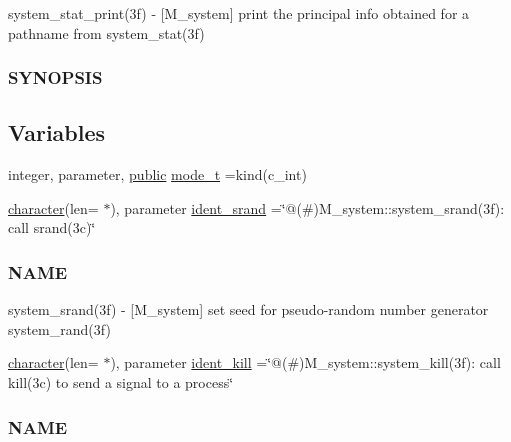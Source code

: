 \begin{DoxyCompactItemize}
\begin{DoxyCompactList}
system\+\_\+stat\+\_\+print(3f) -\/ \mbox{[}M\+\_\+system\mbox{]} print the principal info obtained for a pathname from system\+\_\+stat(3f) \subsubsection*{S\+Y\+N\+O\+P\+S\+IS}\end{DoxyCompactList}\end{DoxyCompactItemize}
\subsection*{Variables}
\begin{DoxyCompactItemize}
\item 
integer, parameter, \hyperlink{M__stopwatch_83_8txt_a2f74811300c361e53b430611a7d1769f}{public} \hyperlink{namespacem__system_abdb5cc27c945379d844db4830d499050}{mode\+\_\+t} =kind(c\+\_\+int)
\item 
\hyperlink{option__stopwatch_83_8txt_abd4b21fbbd175834027b5224bfe97e66}{character}(len= $\ast$), parameter \hyperlink{namespacem__system_a3bdea86816bce4dced7f05da643b499a}{ident\+\_\+srand} =\char`\"{}@(\#)M\+\_\+system\+::system\+\_\+srand(3f)\+: call srand(3c)\char`\"{}
\begin{DoxyCompactList}\small\item\em \subsubsection*{N\+A\+ME}

system\+\_\+srand(3f) -\/ \mbox{[}M\+\_\+system\mbox{]} set seed for pseudo-\/random number generator system\+\_\+rand(3f) \end{DoxyCompactList}\item 
\hyperlink{option__stopwatch_83_8txt_abd4b21fbbd175834027b5224bfe97e66}{character}(len= $\ast$), parameter \hyperlink{namespacem__system_a18b4c54ccbabc1d82affd798656ec9ae}{ident\+\_\+kill} =\char`\"{}@(\#)M\+\_\+system\+::system\+\_\+kill(3f)\+: call kill(3c) to send a signal to a process\char`\"{}
\begin{DoxyCompactList}\small\item\em \subsubsection*{N\+A\+ME}


\end{DoxyCompactList}
\end{DoxyCompactItemize}
